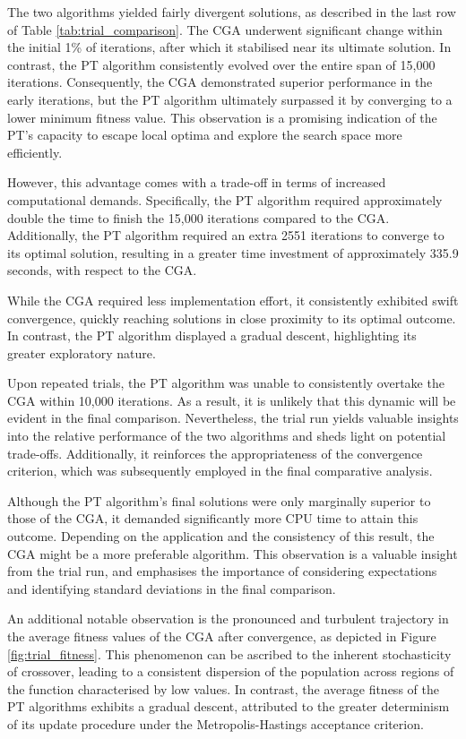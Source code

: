 \documentclass[10pt]{article}
\begin{document}
\begin{multicols}{2}
The two algorithms yielded fairly divergent solutions, as described in the last row of Table \ref{tab:trial_comparison}. The CGA underwent significant change within the initial 1\% of iterations, after which it stabilised near its ultimate solution. In contrast, the PT algorithm consistently evolved over the entire span of 15,000 iterations. Consequently, the CGA demonstrated superior performance in the early iterations, but the PT algorithm ultimately surpassed it by converging to a lower minimum fitness value. This observation is a promising indication of the PT's capacity to escape local optima and explore the search space more efficiently.

However, this advantage comes with a trade-off in terms of increased computational demands. Specifically, the PT algorithm required approximately double the time to finish the 15,000 iterations compared to the CGA. Additionally, the PT algorithm required an extra 2551 iterations to converge to its optimal solution, resulting in a greater time investment of approximately 335.9 seconds, with respect to the CGA.

While the CGA required less implementation effort, it consistently exhibited swift convergence, quickly reaching solutions in close proximity to its optimal outcome. In contrast, the PT algorithm displayed a gradual descent, highlighting its greater exploratory nature. 

Upon repeated trials, the PT algorithm was unable to consistently overtake the CGA within 10,000 iterations. As a result, it is unlikely that this dynamic will be evident in the final comparison. Nevertheless, the trial run yields valuable insights into the relative performance of the two algorithms and sheds light on potential trade-offs. Additionally, it reinforces the appropriateness of the convergence criterion, which was subsequently employed in the final comparative analysis.

Although the PT algorithm's final solutions were only marginally superior to those of the CGA, it demanded significantly more CPU time to attain this outcome. Depending on the application and the consistency of this result, the CGA might be a more preferable algorithm. This observation is a valuable insight from the trial run, and emphasises the importance of considering expectations and identifying standard deviations in the final comparison.

An additional notable observation is the pronounced and turbulent trajectory in the average fitness values of the CGA after convergence, as depicted in Figure \ref{fig:trial_fitness}. This phenomenon can be ascribed to the inherent stochasticity of crossover, leading to a consistent dispersion of the population across regions of the function characterised by low values. In contrast, the average fitness of the PT algorithms exhibits a gradual descent, attributed to the greater determinism of its update procedure under the Metropolis-Hastings acceptance criterion.


\end{multicols}
\end{document}
